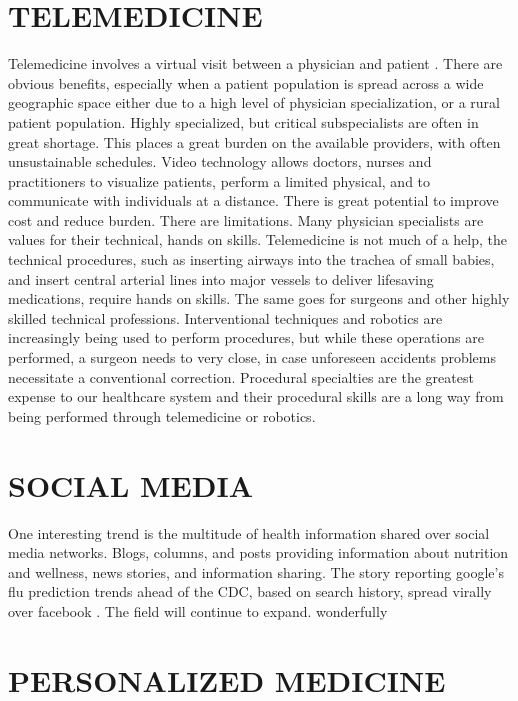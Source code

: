 \documentclass[sigconf]{acmart}
\begin{document}
\section{TELEMEDICINE}

Telemedicine involves a virtual visit between a physician and patient
\cite{hernandez2016pediatric}.  There are obvious benefits, especially when a patient population
is spread across a wide geographic space either due to a high level of
physician specialization, or a rural patient population. Highly
specialized, but critical subspecialists are often in great shortage.
This places a great burden on the available providers, with often
unsustainable schedules.  Video technology allows doctors, nurses and
practitioners to visualize patients, perform a limited physical, and
to communicate with individuals at a distance.  There is great
potential to improve cost and reduce burden. There are limitations.
Many physician specialists are values for their technical, hands on
skills.  Telemedicine is not much of a help, the technical procedures,
such as inserting airways into the trachea of small babies, and insert
central arterial lines into major vessels to deliver lifesaving
medications, require hands on skills.  The same goes for surgeons and
other highly skilled technical professions.  Interventional techniques
and robotics are increasingly being used to perform procedures, but
while these operations are performed, a surgeon needs to very close,
in case unforeseen accidents problems necessitate a conventional
correction. Procedural specialties are the greatest expense to our
healthcare system and their procedural skills are a long way from
being performed through telemedicine or robotics.
 
\section{SOCIAL MEDIA}

One interesting trend is the multitude of health information shared
over social media networks.  Blogs, columns, and posts providing
information about nutrition and wellness, news stories, and
information sharing.  The story reporting google’s flu prediction
trends ahead of the CDC, based on search history, spread virally over
facebook \cite{ginsberg2009detecting}.  The field will continue to expand.  wonderfully

\section{PERSONALIZED MEDICINE}
\end{document}
